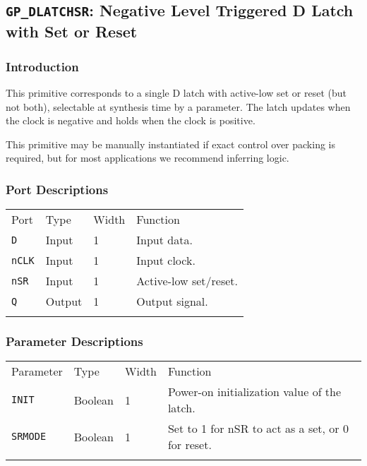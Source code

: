 \documentclass[11pt]{article}
\newcommand{\tokenstyle}[1]{\texttt{#1}}
\newcommand{\whenstyle}[1]{{\fontseries{sb}\selectfont#1}}
\newcommand{\thinhline}{\Xhline{1\arrayrulewidth}}
\newcommand{\thickhline}{\Xhline{2.5\arrayrulewidth}}
\begin{document}
\subsection{\tokenstyle{GP\_DLATCHSR}: Negative Level Triggered D Latch with Set or Reset}
\label{gp-latchsr}

\subsubsection{Introduction}
This primitive corresponds to a single D latch with active-low set or reset (but not both), selectable at synthesis time by 
a parameter. The latch updates when the clock is negative and holds when the clock is positive.

This primitive may be manually instantiated if exact control over packing is required, but for most applications we
recommend inferring logic.

\subsubsection{Port Descriptions}

\begin{tabularx}{\textwidth}{lllX}
\thinhline
\whenstyle{Port} & \whenstyle{Type} & \whenstyle{Width} & \whenstyle{Function} \\
\thickhline
\tokenstyle{D} & Input & 1 & Input data. \\
\thinhline
\tokenstyle{nCLK} & Input & 1 & Input clock. \\
\thinhline
\tokenstyle{nSR} & Input & 1 & Active-low set/reset. \\
\thinhline
\tokenstyle{Q} & Output & 1 & Output signal. \\
\thinhline
\end{tabularx}

\subsubsection{Parameter Descriptions}

\begin{tabularx}{\textwidth}{lllX}
\thinhline
\whenstyle{Parameter} & \whenstyle{Type} & \whenstyle{Width} & \whenstyle{Function} \\
\thickhline
\tokenstyle{INIT} & Boolean & 1 & Power-on initialization value of the latch.\\
\thinhline
\tokenstyle{SRMODE} & Boolean & 1 & Set to 1 for nSR to act as a set, or 0 for reset. \\
\thinhline
\end{tabularx}
\end{document}
